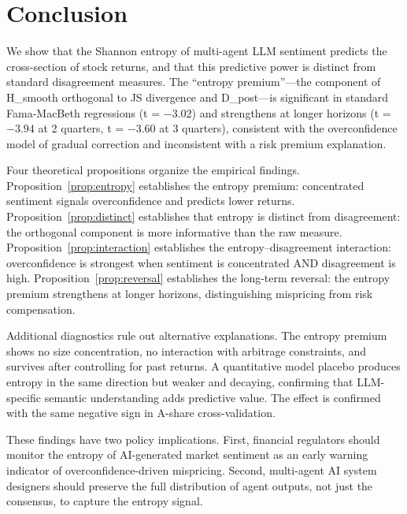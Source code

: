 \documentclass[12pt,a4paper]{article}
\begin{document}
\section{Conclusion}\label{sec:conclusion}

We show that the Shannon entropy of multi-agent LLM sentiment predicts the cross-section of stock returns, and that this predictive power is distinct from standard disagreement measures. The ``entropy premium''---the component of H\_smooth orthogonal to JS divergence and D\_post---is significant in standard Fama-MacBeth regressions (t = $-3.02$) and strengthens at longer horizons (t = $-3.94$ at 2 quarters, t = $-3.60$ at 3 quarters), consistent with the \citet{Daniel1998} overconfidence model of gradual correction and inconsistent with a risk premium explanation.

Four theoretical propositions organize the empirical findings. Proposition~\ref{prop:entropy} establishes the entropy premium: concentrated sentiment signals overconfidence and predicts lower returns. Proposition~\ref{prop:distinct} establishes that entropy is distinct from disagreement: the orthogonal component is more informative than the raw measure. Proposition~\ref{prop:interaction} establishes the entropy--disagreement interaction: overconfidence is strongest when sentiment is concentrated AND disagreement is high. Proposition~\ref{prop:reversal} establishes the long-term reversal: the entropy premium strengthens at longer horizons, distinguishing mispricing from risk compensation.

Additional diagnostics rule out alternative explanations. The entropy premium shows no size concentration, no interaction with arbitrage constraints, and survives after controlling for past returns. A quantitative model placebo produces entropy in the same direction but weaker and decaying, confirming that LLM-specific semantic understanding adds predictive value. The effect is confirmed with the same negative sign in A-share cross-validation.

These findings have two policy implications. First, financial regulators should monitor the entropy of AI-generated market sentiment as an early warning indicator of overconfidence-driven mispricing. Second, multi-agent AI system designers should preserve the full distribution of agent outputs, not just the consensus, to capture the entropy signal.



\end{document}
